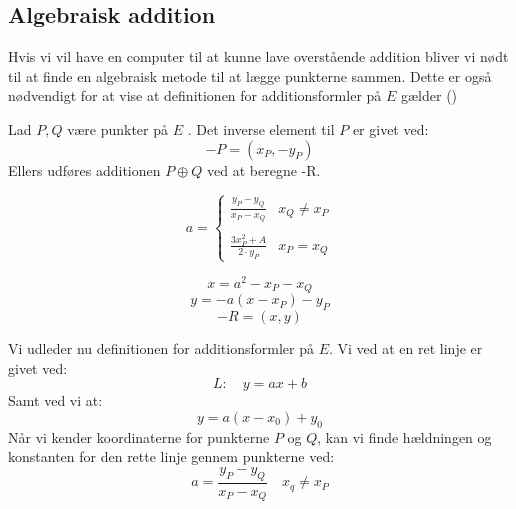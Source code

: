 \subsection{Algebraisk addition}
Hvis vi vil have en computer til at kunne lave overstående addition bliver vi nødt til at finde en algebraisk metode til at lægge punkterne sammen. Dette er også nødvendigt for at vise at definitionen for additionsformler på $E$ gælder (\cite{williamstein2006}) 

\begin{mdframed}[frametitle={Definition for additionsformler på $E$}]
Lad $P, Q$ være punkter på $E$ . Det inverse element til $P$ er givet ved:
\begin{equation}\label{eq:invers}
    -P = (x_{P}, -y_{P})
\end{equation}
Ellers udføres additionen $P\oplus Q$ ved at beregne -R.

\begin{equation}
    a=
    \left\{\begin{matrix}\label{eq:slope}
     \frac{y_{P}-y_{Q}}{x_{P}-x_{Q}}& x_{Q} \neq x_P\\\\ 
     \frac{3x_{P}^2+A}{2\cdot y_{P}}& x_P = x_Q
    \end{matrix}\right.
\end{equation}

\begin{equation}
    x=a^2- x_P - x_Q
\end{equation}
\begin{equation}
    y=-a(x - x_P )- y_P
\end{equation}
\begin{equation}
    -R = (x, y)
\end{equation}


\end{mdframed}
Vi udleder nu definitionen for additionsformler på $E$. Vi ved at en ret linje er givet ved:
\begin{equation}\label{eq:ret_linje}
    L: \quad y=ax+b
\end{equation}
Samt ved vi at:
\begin{equation}\label{eq:ret_ligning}
    y = a(x-x_0)+y_0
\end{equation}
Når vi kender koordinaterne for punkterne $P$ og $Q$, kan vi finde hældningen og konstanten for den rette linje gennem punkterne ved:
\begin{equation}
    a = \frac{y_P-y_Q}{x_P-x_Q} \quad x_q \neq x_P
\end{equation}

